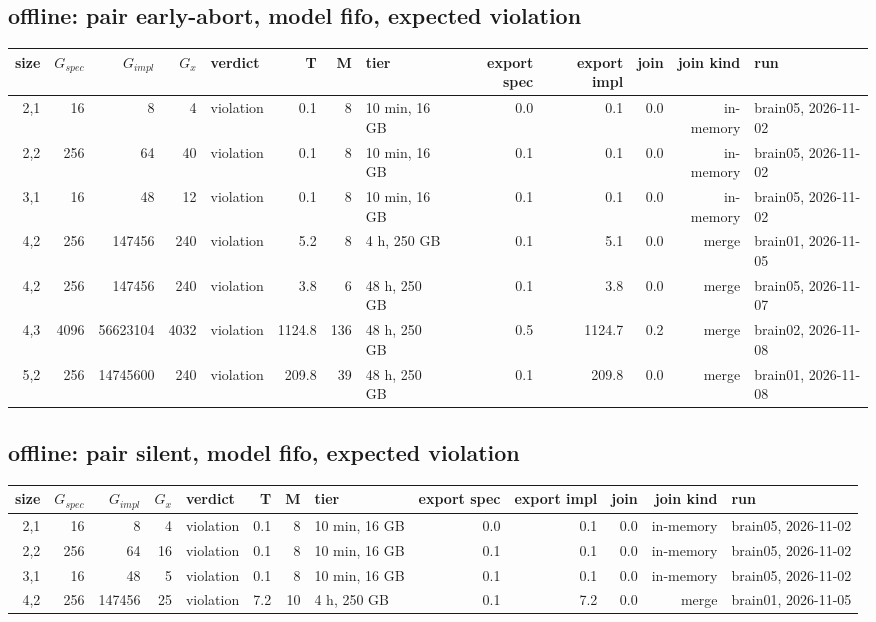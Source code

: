 \documentclass[10pt]{article}
\begin{document}
\subsection*{offline: pair \textsf{early-abort}, model fifo, expected violation}
\begin{longtable}{@{}rrrrlrrlrrrrl@{}}
\toprule
size & $G_{\mathit{spec}}$ & $G_{\mathit{impl}}$ & $G_x$ & verdict & T & M & tier & export spec & export impl & join & join kind & run \\
\midrule
\endhead
\color{red} 2,1 & 16 & 8 & 4 & violation & 0.1 & 8 & 10 min, 16 GB & 0.0 & 0.1 & 0.0 & in-memory & brain05, 2026-11-02 \\
\color{red} 2,2 & 256 & 64 & 40 & violation & 0.1 & 8 & 10 min, 16 GB & 0.1 & 0.1 & 0.0 & in-memory & brain05, 2026-11-02 \\
\color{red} 3,1 & 16 & 48 & 12 & violation & 0.1 & 8 & 10 min, 16 GB & 0.1 & 0.1 & 0.0 & in-memory & brain05, 2026-11-02 \\
\color{blue} 4,2 & 256 & 147456 & 240 & violation & 5.2 & 8 & 4 h, 250 GB & 0.1 & 5.1 & 0.0 & merge & brain01, 2026-11-05 \\
\color{blue} 4,2 & 256 & 147456 & 240 & violation & 3.8 & 6 & 48 h, 250 GB & 0.1 & 3.8 & 0.0 & merge & brain05, 2026-11-07 \\
\color{blue} 4,3 & 4096 & 56623104 & 4032 & violation & 1124.8 & 136 & 48 h, 250 GB & 0.5 & 1124.7 & 0.2 & merge & brain02, 2026-11-08 \\
\color{blue} 5,2 & 256 & 14745600 & 240 & violation & 209.8 & 39 & 48 h, 250 GB & 0.1 & 209.8 & 0.0 & merge & brain01, 2026-11-08 \\
\bottomrule
\end{longtable}
\subsection*{offline: pair \textsf{silent}, model fifo, expected violation}
\begin{longtable}{@{}rrrrlrrlrrrrl@{}}
\toprule
size & $G_{\mathit{spec}}$ & $G_{\mathit{impl}}$ & $G_x$ & verdict & T & M & tier & export spec & export impl & join & join kind & run \\
\midrule
\endhead
\color{red} 2,1 & 16 & 8 & 4 & violation & 0.1 & 8 & 10 min, 16 GB & 0.0 & 0.1 & 0.0 & in-memory & brain05, 2026-11-02 \\
\color{red} 2,2 & 256 & 64 & 16 & violation & 0.1 & 8 & 10 min, 16 GB & 0.1 & 0.1 & 0.0 & in-memory & brain05, 2026-11-02 \\
\color{red} 3,1 & 16 & 48 & 5 & violation & 0.1 & 8 & 10 min, 16 GB & 0.1 & 0.1 & 0.0 & in-memory & brain05, 2026-11-02 \\
\color{blue} 4,2 & 256 & 147456 & 25 & violation & 7.2 & 10 & 4 h, 250 GB & 0.1 & 7.2 & 0.0 & merge & brain01, 2026-11-05 \\
\bottomrule
\end{longtable}
\end{document}
